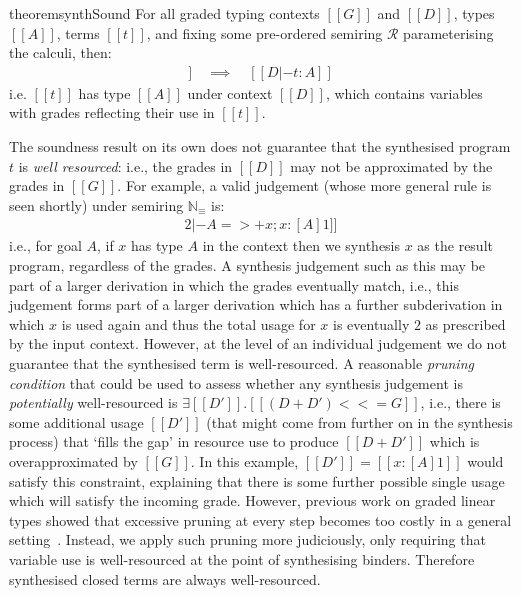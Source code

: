 \begin{restatable}{theorem}{synthSound}
\label{lemma:synthSound}
For all graded typing contexts $[[ G ]]$ and $[[ D ]]$, types $[[ A ]]$, terms $[[ t ]]$,
and fixing some pre-ordered semiring $\mathcal{R}$ parameterising the calculi,
then:
\begin{align*}
[[ G |- A =>+ t ; D ]] \quad \implies \quad [[ D |- t : A ]]
\end{align*}
i.e. $[[ t ]]$ has type $[[ A ]]$
under context $[[ D ]]$,
which contains variables with grades reflecting their use in $[[ t ]]$.
\end{restatable}
%
The soundness result on its own does not guarantee that the synthesised program $t$
is \emph{well resourced}: i.e., the grades in $[[ D ]]$ may not
be approximated by the grades in $[[ G ]]$. For example, a valid judgement
(whose more general rule is seen shortly) under semiring $\mathbb{N}_\equiv$ is:
%
\begin{align*}
[[ x : [A] 2 |- A =>+ x ; x : [A] 1 ]]
\end{align*}
%
i.e., for goal $A$, if $x$ has type $A$ in the context then we synthesis $x$ as the result
program, regardless of the grades. A synthesis
judgement such as this may be part of a larger derivation in which the grades eventually
match, i.e., this judgement forms part of a larger derivation which has a further
subderivation in which $x$ is used again and thus the total usage for $x$ is
eventually $2$ as prescribed by the input context. However,
at the level of an individual judgement we do not guarantee
that the synthesised term is well-resourced. A reasonable \emph{pruning condition} that could be used to
assess whether any synthesis judgement is \emph{potentially} well-resourced
is $\exists [[ D' ]] . [[ (D + D') <<= G ]]$,
i.e., there is some additional usage $[[ D' ]]$ (that might come from further on
in the synthesis process) that `fills the gap' in resource use to produce $[[ D + D' ]]$ which
is overapproximated by $[[ G ]]$. In this example,
$[[ D' ]] = [[ x : [A] 1 ]]$ would satisfy this constraint, explaining that there is some further possible
single usage which will satisfy the incoming grade. However, previous work on graded linear
types showed that excessive pruning at every step becomes
too costly in a general setting~\cite{DBLP:conf/lopstr/HughesO20}. Instead,
we apply such pruning more judiciously, only requiring that variable use is
well-resourced at the point of synthesising binders. Therefore synthesised
closed terms are always well-resourced.


